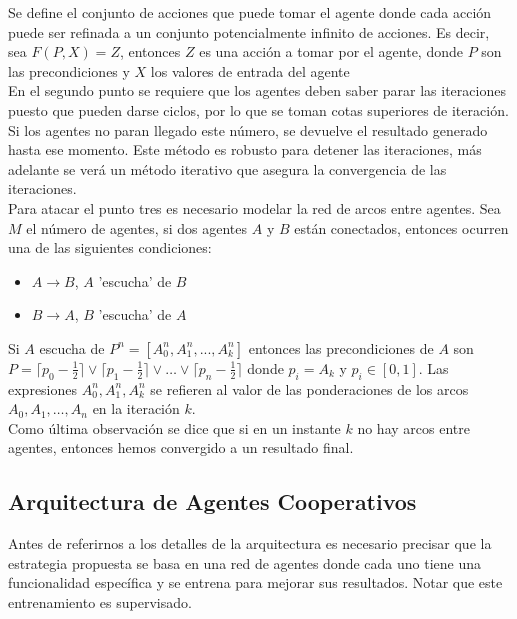         Se define el conjunto de acciones que puede tomar el agente donde cada acción puede ser refinada a un conjunto potencialmente infinito de acciones. Es decir, sea $F(P,X)=Z$, entonces $Z$ es una acción a tomar por el agente, donde $P$ son las precondiciones y $X$ los valores de entrada del agente \\

        En el segundo punto se requiere que los agentes deben saber parar las iteraciones puesto que pueden darse ciclos, por lo que se toman cotas superiores de iteración. Si los agentes no paran llegado este número, se devuelve el resultado generado hasta ese momento. Este método es robusto para detener las iteraciones, más adelante se verá un método iterativo que asegura la convergencia de las iteraciones. \\

        Para atacar el punto tres es necesario modelar la red de arcos entre agentes. Sea $M$ el número de agentes, si dos agentes $A$ y $B$ están conectados, entonces ocurren una de las siguientes condiciones:

        \begin{itemize}
            \item $A\rightarrow B$, $A$ 'escucha' de $B$
            \item  $B \rightarrow A$, $B$ 'escucha' de $A$
        \end{itemize}

        Si $A$ escucha de $P^n=[A_0^n,A_1^n,...,A_k^n]$ entonces las precondiciones de $A$ son $P=\lceil p_0 - \frac{1}{2} \rceil \lor \lceil p_1 - \frac{1}{2} \rceil \lor \dots \lor \lceil p_n - \frac{1}{2} \rceil$ donde 
         $p_i=A_k$ y $p_i \in [0,1]$. Las expresiones $A_0^n,A_1^n,A_k^n$ se refieren al valor de las ponderaciones de los arcos $A_0,A_1,\dots,A_n$ en la iteración $k$. \\

        Como última observación se dice que si en un instante $k$ no hay arcos entre agentes, entonces hemos convergido a un resultado final.

    \subsection*{Arquitectura de Agentes Cooperativos}

        Antes de referirnos a los detalles de la arquitectura es necesario precisar que la estrategia propuesta se basa en una red de agentes donde cada uno tiene una funcionalidad 
        específica y se entrena para mejorar sus resultados. Notar que este entrenamiento es supervisado. \\

